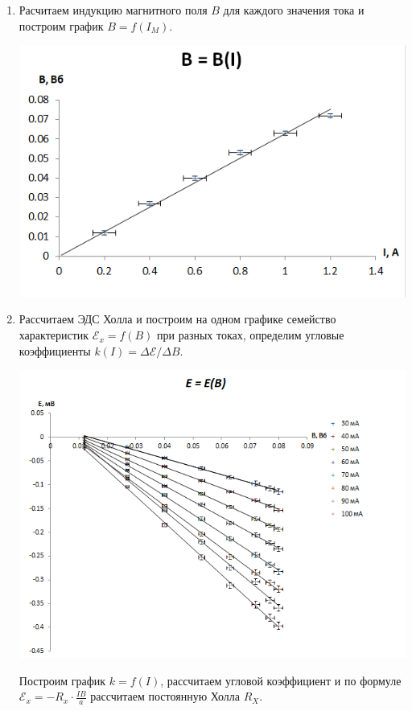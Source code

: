 \documentclass[a4paper,12pt]{article}
\begin{document}
\begin{enumerate}
\item Расчитаем индукцию магнитного поля $B$ для каждого значения тока и построим график $B = f(I_M)$.\\
\begin{center}
\includegraphics[scale=0.6]{4.png}
\end{center}
\item Рассчитаем ЭДС Холла и построим на одном графике семейство характеристик $\mathcal{E}_x=f(B)$ при разных токах, определим угловые коэффициенты $k(I)=\Delta \mathcal{E}/ \Delta B$.\\
\begin{center}
\includegraphics[scale=0.6]{2.png}
\end{center}
Построим график $k = f(I)$, рассчитаем угловой коэффициент и по формуле $\mathcal{E}_x= -R_x \cdot \frac{IB}{a}$ рассчитаем постоянную Холла $R_X$.

\end{enumerate}
\end{document}
